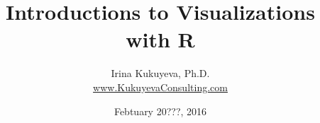 \title{ Introductions to Visualizations with \ttfamily R \normalfont }
\author{Irina Kukuyeva, Ph.D. \\ \ttfamily \url{www.KukuyevaConsulting.com} \normalfont}
\date{Febtuary 20???, 2016}



\frame{ \titlepage }
